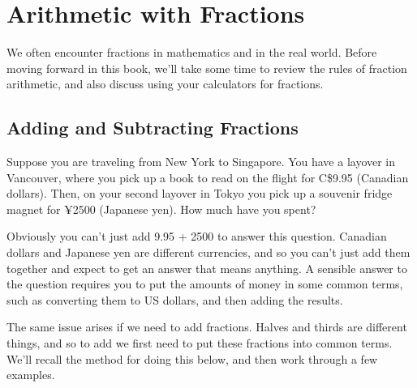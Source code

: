
%
%

\section{Arithmetic with Fractions}
\label{ArithmeticwithFractions}

We often encounter fractions in mathematics and in the real world. Before moving forward in this book, we’ll take some time to review the rules of fraction arithmetic, and also discuss using your calculators for fractions.

%
%

\subsection{Adding and Subtracting Fractions}

Suppose you are traveling from New York to Singapore. You have a layover in Vancouver, where you pick up a book to read on the flight for C\$9.95 (Canadian dollars). Then, on your second layover in Tokyo you pick up a souvenir fridge magnet for ¥2500 (Japanese yen). How much have you spent?

Obviously you can’t just add 9.95 + 2500 to answer this question. Canadian dollars and Japanese yen are different currencies, and so you can’t just add them together and expect to get an answer that means anything. A sensible answer to the question requires you to put the amounts of money in some common terms, such as converting them to US dollars, and then adding the results.

The same issue arises if we need to add fractions. Halves and thirds are different things, and so to add we first need to put these fractions into common terms. We’ll recall the method for doing this below, and then work through a few examples.

%
%

